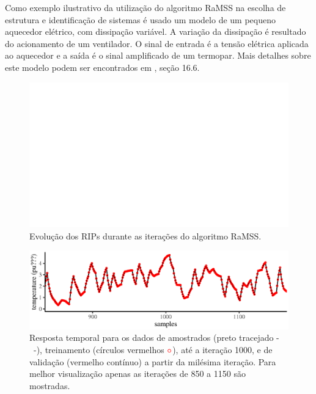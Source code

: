 \begin{exmp}
  \label{ex:varHeater}
  Como exemplo ilustrativo da utilização do algoritmo RaMSS na escolha de estrutura e identificação de sistemas é usado um modelo de um pequeno aquecedor elétrico, com dissipação variável. A variação da dissipação é resultado do acionamento de um ventilador. O sinal de entrada é a tensão elétrica aplicada ao aquecedor e a saída é o sinal amplificado de um termopar. Mais detalhes sobre este modelo podem ser encontrados em \citep{aguirre2015}, seção 16.6.

  \begin{figure}[H]
    \centering
    \includegraphics{./Figs/s.heater.var.dissip_RIPs.eps}
    \caption{Evolução dos RIPs durante as iterações do algoritmo RaMSS.}
    \label{fig:RIPs1}
  \end{figure}

  \begin{figure}[H]
    \centering
    \includegraphics{./Figs/s.heater.var.dissip_train_val_data.eps}
    \caption{Resposta temporal para os dados de amostrados (preto tracejado -\ -), treinamento (círculos vermelhos $\color{red} \circ$), até a iteração 1000, e de validação (vermelho contínuo) a partir da milésima iteração. Para melhor visualização apenas as iterações de 850 a 1150 são mostradas. }
    \label{fig:}
  \end{figure}

\end{exmp}

